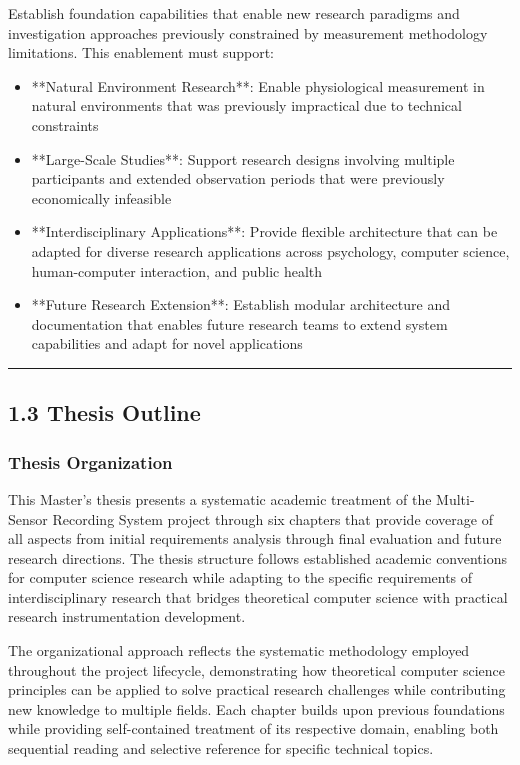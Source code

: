 \documentclass[11pt,a4paper]{article}
\begin{document}
Establish foundation capabilities that enable new research paradigms and
investigation approaches previously constrained
by measurement methodology limitations. This enablement must support:

\begin{itemize}
\item **Natural Environment Research**: Enable physiological measurement in natural environments that was previously
  impractical due to technical constraints
\item **Large-Scale Studies**: Support research designs involving multiple participants and extended observation periods
  that were previously economically infeasible
\item **Interdisciplinary Applications**: Provide flexible architecture that can be adapted for diverse research
  applications across psychology, computer science, human-computer interaction, and
  public health
\item **Future Research Extension**: Establish modular architecture and documentation that enables future
  research teams to extend system capabilities and adapt for novel applications

\end{itemize}
\hrule

\subsection{1.3 Thesis Outline}

\subsubsection{Thesis Organization}

This Master's thesis presents a systematic academic treatment of the Multi-Sensor
Recording System project through six
chapters that provide coverage of all aspects from initial
requirements analysis through final
evaluation and future research directions.  The thesis structure follows established
academic conventions for computer
science research while adapting to the specific requirements of interdisciplinary
research that bridges theoretical
computer science with practical research instrumentation development.

The organizational approach reflects the systematic methodology employed throughout
the project lifecycle, demonstrating
how theoretical computer science principles can be applied to solve practical
research challenges while contributing new
knowledge to multiple fields.  Each chapter builds upon previous foundations while
providing self-contained treatment of
its respective domain, enabling both sequential reading and selective reference for
specific technical topics.
\end{document}
